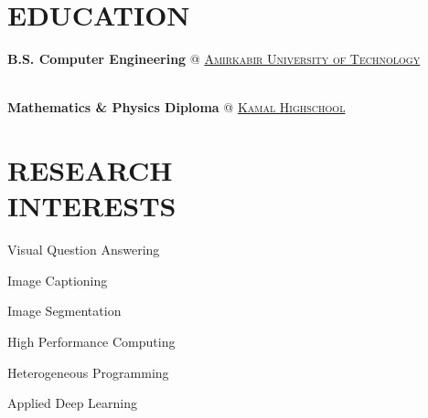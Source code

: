 \documentclass[margin, 10pt]{res} %
\begin{document}
    \begin{resume}
    
     
    \section{EDUCATION}  
    \textbf{B.S. Computer Engineering} \textsc{@}
	   \href{http://aut.ac.ir/aut/}{\textsc{Amirkabir University of Technology}}\\
	   {}\hfill {}\\
	   {}
 	\vspace{0.1cm}
 	
    \textbf{Mathematics \& Physics Diploma} \textsc{@}
    \href{http://www.kamal.sch.ir/}{\textsc{Kamal Highschool}}\hfill {}

   
	\section{RESEARCH \\ INTERESTS}
	\vspace{0.6cm}
		  	
	 \begin{innerlist}
	\begin{minipage}{0.4\linewidth}
		\item Visual Question Answering
		\item Image Captioning
		\item Image Segmentation
	\end{minipage}
	\begin{minipage}{0.4\linewidth}	
		\item High Performance Computing
		\item Heterogeneous Programming
		\item Applied Deep Learning
	\end{minipage}
\end{innerlist}
		\vspace{0.2cm}
		

\end{resume}
\end{document}

